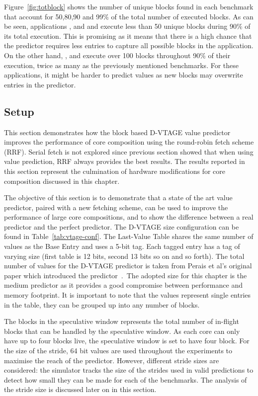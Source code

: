 Figure~\ref{fig:totblock} shows the number of unique blocks found in each benchmark that account for 50,80,90 and 99\% of the total number of executed blocks.
As can be seen, applications ,  and   and  execute less than 50 unique blocks during 90\% of its total execution.
This is promising as it means that there is a high chance that the predictor requires less entries to capture all possible blocks in the application.
On the other hand, , and  execute over 100 blocks throughout 90\% of their execution, twice as many as the previously mentioned benchmarks.
For these applications, it might be harder to predict values as new blocks may overwrite entries in the predictor.


\subsection{Setup}
This section demonstrates how the block based D-VTAGE value predictor improves the performance of core composition using the round-robin fetch scheme (RRF).
Serial fetch is not explored since previous section showed that when using value prediction, RRF always provides the best results.
The results reported in this section represent the culmination of hardware modifications for core composition discussed in this chapter.

The objective of this section is to demonstrate that a state of the art value predictor, paired with a new fetching scheme, can be used to improve the performance of large core compositions, and to show the difference between a real predictor and the perfect predictor.
The D-VTAGE size configuration can be found in Table~\ref{tab:vtage-conf}.
The Last-Value Table shares the same number of values as the Base Entry and uses a 5-bit tag.
Each tagged entry has a tag of varying size (first table is 12 bits, second 13 bits so on and so forth).
The total number of values for the D-VTAGE predictor is taken from Perais et al's original paper which introduced the predictor~\cite{peraisBeBop2015}.\
The adopted size for this chapter is the medium predictor as it provides a good compromise between performance and memory footprint.
It is important to note that the values represent single entries in the table, they can be grouped up into any number of blocks.

The blocks in the speculative window represents the total number of in-flight blocks that can be handled by the speculative window.
As each core can only have up to four blocks live, the speculative window is set to have four block.
For the size of the stride, 64 bit values are used throughout the experiments to maximise the reach of the predictor.
However, different stride sizes are considered: the simulator tracks the size of the strides used in valid predictions to detect how small they can be made for each of the benchmarks.
The analysis of the stride size is discussed later on in this section.

